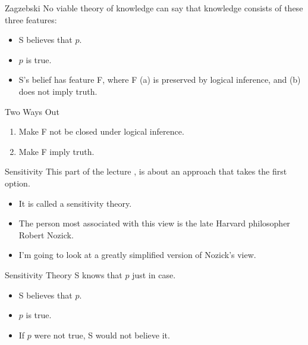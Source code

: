 \documentclass[
  17pt,
  letterpaper,
  ignorenonframetext,
  aspectratio=169,
  handout]{beamer}
\providecommand{\tightlist}{%
  \setlength{\itemsep}{0pt}\setlength{\parskip}{0pt}}\usepackage{longtable,booktabs,array}
\begin{document}
\begin{frame}{Zagzebski}
\protect\hypertarget{zagzebski}{}
No viable theory of knowledge can say that knowledge consists of these
three features:

\begin{itemize}[<+->]
\tightlist
\item
  S believes that \(p\).
\item
  \(p\) is true.
\item
  S's belief has feature F, where F (a) is preserved by logical
  inference, and (b) does not imply truth.
\end{itemize}
\end{frame}

\begin{frame}{Two Ways Out}
\protect\hypertarget{two-ways-out}{}
\begin{enumerate}[<+->]
\tightlist
\item
  Make F not be closed under logical inference.
\item
  Make F imply truth.
\end{enumerate}
\end{frame}

\begin{frame}{Sensitivity}
\protect\hypertarget{sensitivity-1}{}
This part of the lecture , is about an approach that takes the first
option.

\begin{itemize}[<+->]
\tightlist
\item
  It is called a sensitivity theory.
\item
  The person most associated with this view is the late Harvard
  philosopher Robert Nozick.
\item
  I'm going to look at a greatly simplified version of Nozick's view.
\end{itemize}
\end{frame}

\begin{frame}{Sensitivity Theory}
\protect\hypertarget{sensitivity-theory}{}
S knows that \(p\) just in case.

\begin{itemize}[<+->]
\tightlist
\item
  S believes that \(p\).
\item
  \(p\) is true.
\item
  If \(p\) were not true, S would not believe it.
\end{itemize}
\end{frame}
\end{document}
